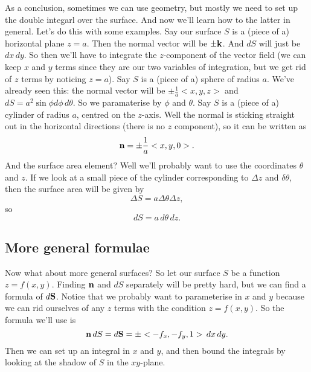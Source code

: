 As a conclusion, sometimes we can use geometry, but mostly we need to set up the double integarl over the surface. And now we'll learn how to the latter in general. Let's do this with some examples.
\bex
Say our surface $S$ is a (piece of a) horizontal plane $z = a$. Then the normal vector will be $\pm \boldsymbol{\mathbf{k}}$. And $dS$ will just be $dx\,dy$. So then we'll have to integrate the $z$-component of the vector field (we can keep $x$ and $y$ terms since they are our two variables of integration, but we get rid of $z$ terms by noticing $z=a$).
\eex
\bex
Say $S$ is a (piece of a) sphere of radius $a$. We've already seen this: the normal vector will be $\pm\frac 1a <x,y,z>$ and $dS = a^2 \sin \phi d\phi\,d\theta$. So we paramaterise by $\phi$ and $\theta$. 
\eex
\bex
Say $S$ is a (piece of a) cylinder of radius $a$, centred on the $z$-axis. Well the normal is sticking straight out in the horizontal directions (there is no $z$ component), so it can be written as 
\[ \boldsymbol{\mathbf{n}} = \pm \frac 1a <x,y,0>. \]  
And the surface area element? Well we'll probably want to use the coordinates $\theta$ and $z$. If we look at a small piece of the cylinder corresponding to $\Delta z$ and $\delta \theta$, then the surface area will be given by
\[ \Delta S = a\Delta \theta \Delta z, \]
so
\[ dS = a \,d \theta\,dz. \]
\eex
\subsection{More general formulae}
Now what about more general surfaces? So let our surface $S$ be a function $z = f(x,y)$. Finding $\boldsymbol{\mathbf{n}}$ and $dS$ separately will be pretty hard, but we can find a formula of $d\boldsymbol{\mathbf{S}}$. Notice that we probably want to parameterise in $x$ and $y$ because we can rid ourselves of any $z$ terms with the condition $z=f(x,y)$. So the formula we'll use is
\[ \boldsymbol{\mathbf{n}}\,dS = d\boldsymbol{\mathbf{S}} = \pm <-f_x, -f_y, 1>\,dx\,dy. \]
Then we can set up an integral in $x$ and $y$, and then bound the integrals by looking at the shadow of $S$ in the $xy$-plane. 


